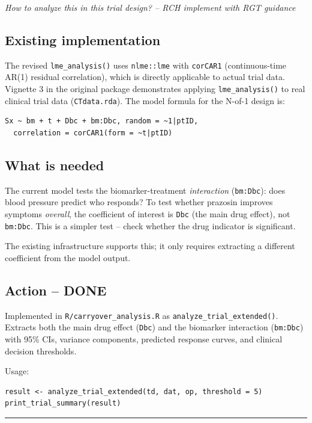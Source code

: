 \documentclass[11pt]{article}
\begin{document}
\textit{How to analyze this in this trial design? -- RCH implement
with RGT guidance}

\subsection{Existing implementation}

The revised \texttt{lme\_analysis()} uses \texttt{nlme::lme} with \texttt{corCAR1}
(continuous-time AR(1) residual correlation), which is
directly applicable to actual trial data. Vignette 3 in the
original package demonstrates applying \texttt{lme\_analysis()} to
real clinical trial data (\texttt{CTdata.rda}). The model formula
for the N-of-1 design is:

\begin{verbatim}
Sx ~ bm + t + Dbc + bm:Dbc, random = ~1|ptID,
  correlation = corCAR1(form = ~t|ptID)
\end{verbatim}

\subsection{What is needed}

The current model tests the biomarker-treatment
\textit{interaction} (\texttt{bm:Dbc}): does blood pressure predict who
responds? To test whether prazosin improves symptoms
\textit{overall}, the coefficient of interest is \texttt{Dbc} (the main
drug effect), not \texttt{bm:Dbc}. This is a simpler test -- check
whether the drug indicator is significant.

The existing infrastructure supports this; it only requires
extracting a different coefficient from the model output.

\subsection{Action -- DONE}

Implemented in \texttt{R/carryover\_analysis.R} as
\texttt{analyze\_trial\_extended()}. Extracts both the main drug
effect (\texttt{Dbc}) and the biomarker interaction (\texttt{bm:Dbc})
with 95\% CIs, variance components, predicted response
curves, and clinical decision thresholds.

Usage:
\begin{lstlisting}
result <- analyze_trial_extended(td, dat, op, threshold = 5)
print_trial_summary(result)
\end{lstlisting}

\bigskip\noindent\rule{\textwidth}{0.4pt}\bigskip
\end{document}
